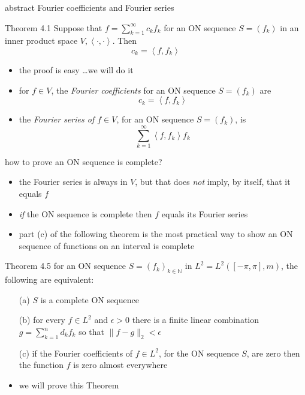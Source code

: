 \documentclass[10pt,
               svgnames,
               hyperref={colorlinks,
                         citecolor=DeepPink4,
                         linkcolor=FireBrick,
                         urlcolor=blue},
               usepdftitle=false]{beamer}
\newcommand{\NN}{\mathbb{N}}
\newcommand{\eps}{\epsilon}
\newcommand{\ip}[2]{\left<#1,#2\right>}
\begin{document}
\begin{frame}{abstract Fourier coefficients and Fourier series}

\begin{block}{Theorem 4.1}
Suppose that $f = \sum_{k=1}^\infty c_k f_k$ for an ON sequence $S=(f_k)$ in an inner product space $V,\ip{\cdot}{\cdot}$.  Then
	$$c_k = \ip{f}{f_k}$$
\end{block}

\begin{itemize}
\item the proof is easy \dots we will do it
\end{itemize}

\begin{definition}
\begin{itemize}
\item for $f\in V$, the \emph{Fourier coefficients} for an ON sequence $S=(f_k)$ are
 	$$c_k = \ip{f}{f_k}$$
\item the \emph{Fourier series of $f\in V$}, for an ON sequence $S=(f_k)$, is
	$$\sum_{k=1}^\infty \ip{f}{f_k} f_k$$
\end{itemize}
\end{definition}
\end{frame}


\begin{frame}{how to prove an ON sequence is complete?}

\begin{itemize}
\item the Fourier series is always in $V$, but that does \emph{not} imply, by itself, that it equals $f$
\item \emph{if} the ON sequence is complete then $f$ equals its Fourier series
\item part (c) of the following theorem is the most practical way to show an ON sequence of functions on an interval is complete
\end{itemize}

\begin{block}{Theorem 4.5}
for an ON sequence $S=(f_k)_{k\in\NN}$ in $L^2=L^2([-\pi,\pi],m)$, the following are equivalent:
\begin{itemize}
\item[(a)] $S$ is a complete ON sequence
\item[(b)] for every $f\in L^2$ and $\eps>0$ there is a finite linear combination $g = \sum_{k=1}^n d_k f_k$ so that $\|f-g\|_2 < \eps$
\item[(c)] if the Fourier coefficients of $f\in L^2$, for the ON sequence $S$, are zero then the function $f$ is zero almost everywhere
\end{itemize}
\end{block}

\begin{itemize}
\item we will prove this Theorem
\end{itemize}
\end{frame}
\end{document}
